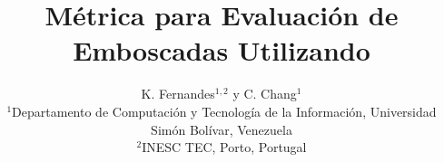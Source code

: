 \documentclass{egpubl}
\title[Ambush]%
      {M\'etrica para Evaluaci\'on de Emboscadas Utilizando \ambush}
\author[K. Fernandes \& C. Chang]
       {K. Fernandes$^{1,2}$
        y C. Chang$^{1}$
        \\
         $^1$Departamento de Computaci\'on y Tecnolog\'ia de la
         Informaci\'on, Universidad Sim\'on Bol\'ivar, Venezuela\\
         $^2$INESC TEC, Porto, Portugal
      }
\begin{document}
\noEGpagenumber

\maketitle









%





\end{document}
